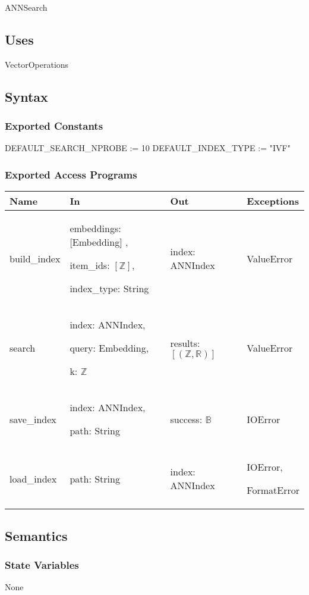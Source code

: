 \documentclass[12pt, titlepage]{article}
\begin{document}
ANNSearch

\subsection{Uses}
VectorOperations

\subsection{Syntax}

\subsubsection{Exported Constants}
DEFAULT\_SEARCH\_NPROBE := 10
DEFAULT\_INDEX\_TYPE := "IVF"
\subsubsection{Exported Access Programs}

\begin{center}
\begin{tabular}{p{4cm} p{4cm} p{4cm} p{3cm}}
\hline
\textbf{Name} & \textbf{In} & \textbf{Out} & \textbf{Exceptions} \\
\hline
build\_index & embeddings: [Embedding] ,

item\_ids: $[\mathbb{Z}]$,

index\_type: String & index: ANNIndex & ValueError \\
\hline
search & index: ANNIndex,

query: Embedding,

k: $\mathbb{Z}$
 & results: $[(\mathbb{Z}, \mathbb{R})]$ & ValueError \\
\hline
save\_index & index: ANNIndex, 

path: String & success: $\mathbb{B}$ & IOError \\
\hline
load\_index & path: String 
 & index: ANNIndex & IOError, 
 
 FormatError \\
\hline
\end{tabular}
\end{center}

\subsection{Semantics}

\subsubsection{State Variables}
None
\end{document}

